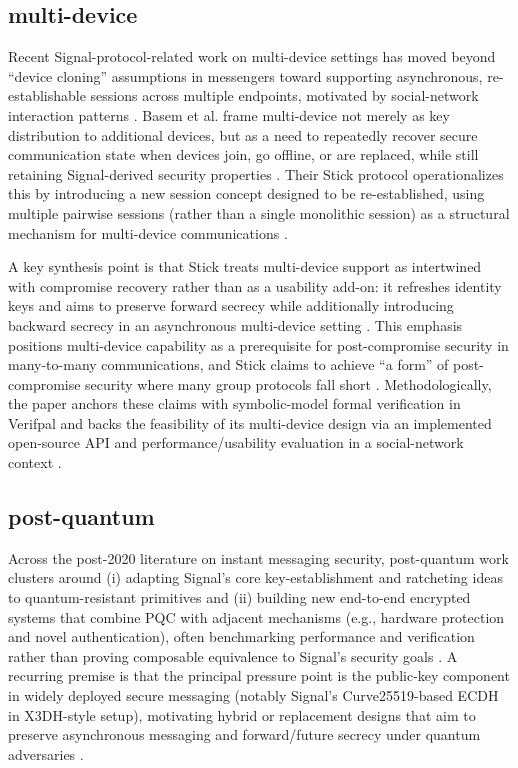 \subsection{multi-device}
Recent Signal-protocol-related work on multi-device settings has moved beyond “device cloning” assumptions in messengers toward supporting asynchronous, re-establishable sessions across multiple endpoints, motivated by social-network interaction patterns \cite{basem2023}. Basem et al. frame multi-device not merely as key distribution to additional devices, but as a need to repeatedly recover secure communication state when devices join, go offline, or are replaced, while still retaining Signal-derived security properties \cite{basem2023}. Their Stick protocol operationalizes this by introducing a new session concept designed to be re-established, using multiple pairwise sessions (rather than a single monolithic session) as a structural mechanism for multi-device communications \cite{basem2023}.

A key synthesis point is that Stick treats multi-device support as intertwined with compromise recovery rather than as a usability add-on: it refreshes identity keys and aims to preserve forward secrecy while additionally introducing backward secrecy in an asynchronous multi-device setting \cite{basem2023}. This emphasis positions multi-device capability as a prerequisite for post-compromise security in many-to-many communications, and Stick claims to achieve “a form” of post-compromise security where many group protocols fall short \cite{basem2023}. Methodologically, the paper anchors these claims with symbolic-model formal verification in Verifpal and backs the feasibility of its multi-device design via an implemented open-source API and performance/usability evaluation in a social-network context \cite{basem2023}.

\subsection{post-quantum}
Across the post-2020 literature on instant messaging security, post-quantum work clusters around (i) adapting Signal’s core key-establishment and ratcheting ideas to quantum-resistant primitives and (ii) building new end-to-end encrypted systems that combine PQC with adjacent mechanisms (e.g., hardware protection and novel authentication), often benchmarking performance and verification rather than proving composable equivalence to Signal’s security goals \cite{boras2025,angom2025,r2025,sharma2023,bobrysheva2021}. A recurring premise is that the principal pressure point is the public-key component in widely deployed secure messaging (notably Signal’s Curve25519-based ECDH in X3DH-style setup), motivating hybrid or replacement designs that aim to preserve asynchronous messaging and forward/future secrecy under quantum adversaries \cite{sharma2023,boras2025}.

